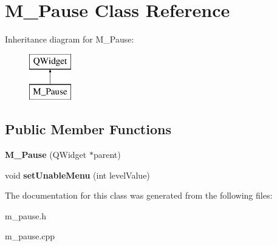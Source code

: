 \hypertarget{class_m___pause}{}\section{M\+\_\+\+Pause Class Reference}
\label{class_m___pause}
Inheritance diagram for M\+\_\+\+Pause\+:\begin{figure}[H]
\begin{center}
\leavevmode
\includegraphics[height=2.000000cm]{class_m___pause}
\end{center}
\end{figure}
\subsection*{Public Member Functions}
\begin{DoxyCompactItemize}
\item 
\hypertarget{class_m___pause_ac1cb95e28d9c158d4dfdba4a08491432}{}{\bfseries M\+\_\+\+Pause} (Q\+Widget $\ast$parent)\label{class_m___pause_ac1cb95e28d9c158d4dfdba4a08491432}

\item 
\hypertarget{class_m___pause_a1c4c4a10f597d250973481b81d575e14}{}void {\bfseries set\+Unable\+Menu} (int level\+Value)\label{class_m___pause_a1c4c4a10f597d250973481b81d575e14}

\end{DoxyCompactItemize}


The documentation for this class was generated from the following files\+:\begin{DoxyCompactItemize}
\item 
m\+\_\+pause.\+h\item 
m\+\_\+pause.\+cpp\end{DoxyCompactItemize}
